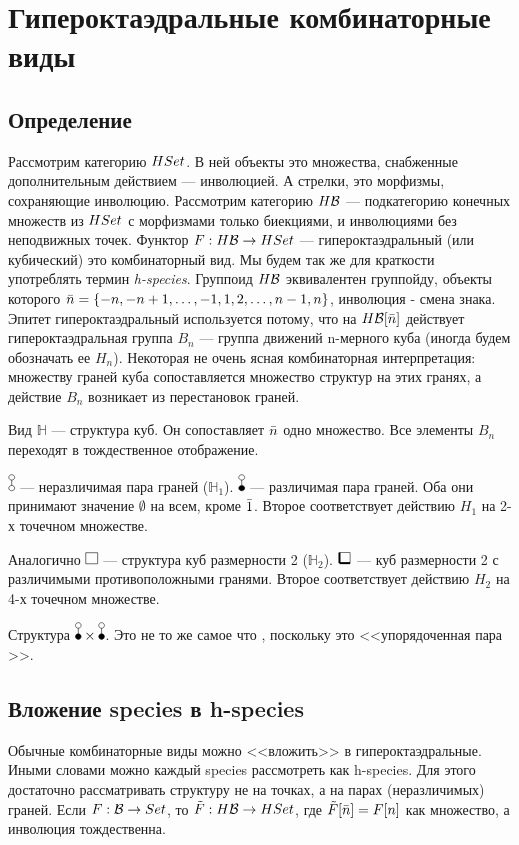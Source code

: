 \section{Гипероктаэдральные комбинаторные виды}
\subsection{Определение}
Рассмотрим категорию $HSet$. В ней объекты это множества, снабженные
дополнительным действием --- инволюцией. А стрелки, это морфизмы, сохраняющие инволюцию. 
Рассмотрим категорию $H\mathcal B$ --- подкатегорию конечных множеств из
$HSet$ с морфизмами только биекциями, и инволюциями без неподвижных точек.
Функтор $F:H\mathcal B \rightarrow HSet$ --- гипероктаэдральный (или кубический)
это комбинаторный вид. Мы будем так же для краткости употреблять термин
\emph{h-species}. Группоид $H\mathcal B$ эквивалентен группойду, объекты которого $\Bar
n = \{-n, -n+1, \dots, -1, 1, 2, \dots, n-1, n\}$, инволюция - смена знака. 
Эпитет гипероктаэдральный используется потому, что на $H\mathcal B[\Bar n]$  действует
гипероктаэдральная группа $B_n$ --- группа движений n-мерного куба (иногда будем обозначать ее $H_n$).
Некоторая не очень ясная комбинаторная интерпретация: множеству граней куба
сопоставляется множество структур на этих гранях, а действие $B_n$ возникает из
перестановок граней.

\begin{example}
Вид $\mathbb H$ --- структура куб. Он сопоставляет $\Bar n$ одно множество. Все
элементы $B_n$ переходят в тождественное отображение.
\end{example}
\begin{example}
$\dA$ --- неразличимая пара граней ($\mathbb H_1$). $\dB$ --- различимая пара
граней.
Оба они принимают значение $\emptyset$ на всем, кроме $\Bar 1$. Второе
соответствует действию $H_1$ на 2-х точечном множестве.
\end{example}
\begin{example}
Аналогично $\dAA$ --- структура куб размерности 2 ($\mathbb H_2$). $\dBB$ ---
куб размерности 2 с различимыми противоположными гранями.  Второе
соответствует действию $H_2$ на 4-х точечном множестве.
\end{example}
\begin{example}
Структура $\dB \times \dB$. Это не то же самое что \dBB, поскольку это <<упорядоченная пара \dB>>.
\end{example}

\subsection{Вложение species в h-species}
Обычные комбинаторные виды можно <<вложить>> в гипероктаэдральные. Иными
словами можно каждый species рассмотреть как h-species. Для этого достаточно
рассматривать структуру не на точках, а на парах (неразличимых) граней. Если
$F:\mathcal B \rightarrow Set$, то $\tilde{F}: H\mathcal B \rightarrow HSet$, где
$\tilde{F}[\Bar n] = F[n]$ как множество, а инволюция тождественна.

